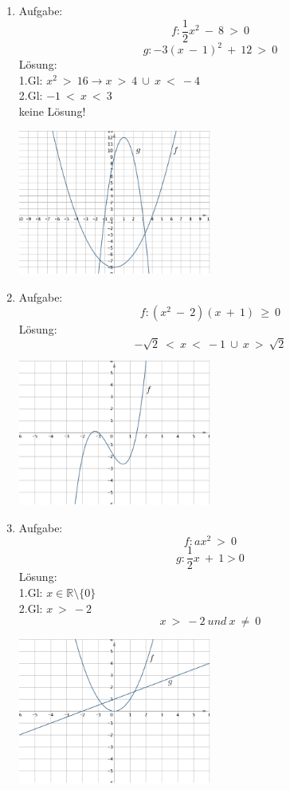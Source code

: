 \begin{enumerate}
\begin{center}
					\end{center}
	\item Aufgabe:
					\[f : \frac 1 2 x^2 \ - \ 8 \ > \ 0\]
					\[g : -3(x \ - \ 1)^2 \ + \ 12 \ > \ 0\]
				L\"osung: \\
					1.Gl: $ x^2 \ > \ 16 \rightarrow x \ > \ 4 \ \cup \ x \ < \ -4 $ \\
					2.Gl: $ -1 \ < \ x \ < \ 3 $ \\
	 				keine L\"osung!
	 				\begin{center}
						\includegraphics[width=0.5\textwidth]{img/Aufgaben/Analytisch/A7.PNG}
					\end{center}
	\item Aufgabe:
					\[f : (x^2 \ - \ 2)(x \ + \ 1) \ \geq \ 0\]
				L\"osung:
					\[ - \sqrt 2 \ < \ x \ < \ -1 \ \cup \ x \ > \ \sqrt 2\]
					\begin{center}
						\includegraphics[width=0.5\textwidth]{img/Aufgaben/Analytisch/A8.PNG}
					\end{center}
	\item Aufgabe:
					\[f : ax^2 \ > \ 0\]
					\[g : \frac 1 2 x \ + \ 1 > 0\]
				L\"osung: \\
					1.Gl: $ x \in \mathbb{R} \setminus \lbrace 0 \rbrace $ \\
					2.Gl: $ x \ > \ -2 $
					\[x \ > \ -2 \ und \ x \ \neq \ 0\]
					\begin{center}
						\includegraphics[width=0.5\textwidth]{img/Aufgaben/Analytisch/A9.PNG}

\end{center}
\end{enumerate}
